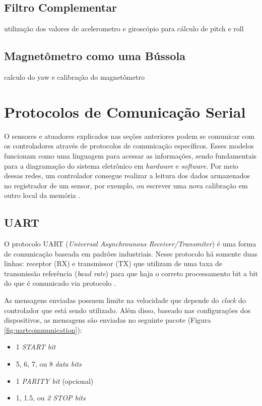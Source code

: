 \subsection{Filtro Complementar}
utilização dos valores de acelerometro e giroscópio para cálculo de pitch e roll

\cite{tcc:viniciusPID2Graus}

\subsection{Magnetômetro como uma Bússola}
calculo do yaw e calibração do magnetômetro

\section{Protocolos de Comunicação Serial}

O sensores e atuadores explicados nas seções anteriores podem se comunicar com os controladores através de protocolos de comunicação específicos. Esses modelos funcionam como uma linguagem para acessar as informações, sendo fundamentais para a diagramação do sistema eletrônico em \textit{hardware} e \textit{software}. Por meio dessas redes, um controlador consegue realizar a leitura dos dados armazenados no registrador de um sensor, por exemplo, ou escrever uma nova calibração em outro local da memória \cite{man:texasI2C}.

\subsection{UART}
O protocolo UART (\textit{Universal Asynchrounous Receiver/Transmiter}) é uma forma de comunicação baseada em padrões industriais. Nesse protocolo há somente duas linhas: receptor (RX) e transmissor (TX) que utilizam de uma taxa de transmissão referência (\textit{baud rate}) para que haja o correto processamento bit a bit do que é comunicado via protocolo \cite{man:texasUART}. 

As mensagens enviadas possuem limite na velocidade que depende do \textit{clock} do controlador que está sendo utilizado. Além disso, baseado nas configurações dos dispositivos, as mensagens são enviadas no seguinte pacote (Figura \ref{fig:uartcommunication}):

\begin{itemize}
	\item 1 \textit{START bit}
	\item 5, 6, 7, ou  8 \textit{data bits}
	\item 1 \textit{PARITY bit} (opcional)
	\item 1, 1.5, ou \textit{2 STOP bits}
\end{itemize}

